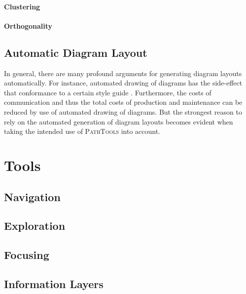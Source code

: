 \paragraph{Clustering}

\paragraph{Orthogonality}

\subsection{Automatic Diagram Layout}
In general, there are many profound arguments for generating diagram layouts automatically.
For instance, automated drawing of diagrams has the side-effect that conformance to a certain style guide .
Furthermore, the costs of communication and thus the total costs of production and maintenance can be reduced by use of automated drawing of diagrams.
But the strongest reason to rely on the automated generation of diagram layouts becomes evident when taking the intended use of \textsc{PathTools} into account.


\section{Tools}
\subsection{Navigation}
\subsection{Exploration}
\subsection{Focusing}
\subsection{Information Layers}
